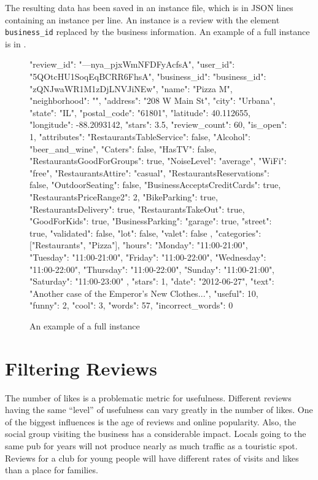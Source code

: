 The resulting data has been saved in an instance file,
which is in JSON lines containing an instance per line.
An instance is a review with the element \texttt{business\_id} replaced by the business information.
An example of a full instance is in .

\begin{figure}[t]\centering
	\begin{codetiny}
{
	"review_id": "---nya_pjxWmNFDFyAcfsA",
	"user_id": "5QOtcHU1SoqEqBCRR6FhsA",
	"business_id": {
		"business_id": "zQNJwaWR1M1zDjLNVJiNEw",
		"name": "Pizza M",
		"neighborhood": "",
		"address": "208 W Main St",
		"city": "Urbana",
		"state": "IL",
		"postal_code": "61801",
		"latitude": 40.112655,
		"longitude": -88.2093142,
		"stars": 3.5,
		"review_count": 60,
		"is_open": 1,
		"attributes": {
			"RestaurantsTableService": false,
			"Alcohol": "beer_and_wine",
			"Caters": false,
			"HasTV": false,
			"RestaurantsGoodForGroups": true,
			"NoiseLevel": "average",
			"WiFi": "free",
			"RestaurantsAttire": "casual",
			"RestaurantsReservations": false,
			"OutdoorSeating": false,
			"BusinessAcceptsCreditCards": true,
			"RestaurantsPriceRange2": 2,
			"BikeParking": true,
			"RestaurantsDelivery": true,
			"RestaurantsTakeOut": true,
			"GoodForKids": true,
			"BusinessParking": {
				"garage": true,
				"street": true,
				"validated": false,
				"lot": false,
				"valet": false
			}
		},
		"categories": ["Restaurants", "Pizza"],
		"hours": {
			"Monday": "11:00-21:00",
			"Tuesday": "11:00-21:00",
			"Friday": "11:00-22:00",
			"Wednesday": "11:00-22:00",
			"Thursday": "11:00-22:00",
			"Sunday": "11:00-21:00",
			"Saturday": "11:00-23:00"
		}
	},
	"stars": 1,
	"date": "2012-06-27",
	"text": "Another case of the Emperor's New Clothes...",
	"useful": 10,
	"funny": 2,
	"cool": 3,
	"words": 57,
	"incorrect_words": 0
}
\end{codetiny}
\caption{An example of a full instance}\label{fig:full_instance}
\end{figure}



\section{Filtering Reviews}\label{sec:filter}


The number of likes is a problematic metric for usefulness.
Different reviews having the same ``level'' of usefulness can vary greatly
in the number of likes.
One of the biggest influences is the age of reviews and online popularity.
Also, the social group visiting the business has a considerable impact.
Locals going to the same pub for years will not produce nearly as much traffic
as a touristic spot.
Reviews for a club for young people will have different rates of visits and likes
than a place for families.

